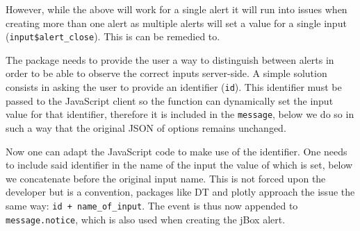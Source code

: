 \documentclass[
]{krantz}
\makeatletter
\newenvironment{Shaded}{\begin{snugshade}}{\end{snugshade}}
\newcommand{\CommentTok}[1]{\textcolor[rgb]{0.37,0.37,0.37}{\textit{#1}}}
\newcommand{\ControlFlowTok}[1]{\textcolor[rgb]{0.27,0.27,0.27}{\textbf{#1}}}
\newcommand{\DataTypeTok}[1]{\textcolor[rgb]{0.27,0.27,0.27}{#1}}
\newcommand{\KeywordTok}[1]{\textcolor[rgb]{0.27,0.27,0.27}{\textbf{#1}}}
\newcommand{\NormalTok}[1]{#1}
\newcommand{\OperatorTok}[1]{\textcolor[rgb]{0.43,0.43,0.43}{\textbf{#1}}}
\newcommand{\StringTok}[1]{\textcolor[rgb]{0.5,0.5,0.5}{#1}}
\newenvironment{kframe}{%
\medskip{}
\setlength{\fboxsep}{.8em}
 \def\at@end@of@kframe{}%
 \ifinner\ifhmode%
  \def\at@end@of@kframe{\end{minipage}}%
  \begin{minipage}{\columnwidth}%
 \fi\fi%
 \def\FrameCommand##1{\hskip\@totalleftmargin \hskip-\fboxsep
 \colorbox{shadecolor}{##1}\hskip-\fboxsep
     \hskip-\linewidth \hskip-\@totalleftmargin \hskip\columnwidth}%
 \MakeFramed {\advance\hsize-\width
   \@totalleftmargin\z@ \linewidth\hsize
   \@setminipage}}%
 {\par\unskip\endMakeFramed%
 \at@end@of@kframe}
\renewenvironment{Shaded}{\begin{kframe}}{\end{kframe}}
\makeatother
\begin{document}
However, while the above will work for a single alert it will run into issues when creating more than one alert as multiple alerts will set a value for a single input (\texttt{input\$alert\_close}). This is can be remedied to.

The package needs to provide the user a way to distinguish between alerts in order to be able to observe the correct inputs server-side.
A simple solution consists in asking the user to provide an identifier (\texttt{id}). This identifier must be passed to the JavaScript client so the function can dynamically set the input value for that identifier, therefore it is included in the \texttt{message}, below we do so in such a way that the original JSON of options remains unchanged.

\begin{Shaded}
\end{Shaded}

Now one can adapt the JavaScript code to make use of the identifier. One needs to include said identifier in the name of the input the value of which is set, below we concatenate before the original input name. This is not forced upon the developer but is a convention, packages like DT and plotly approach the issue the same way: \texttt{id\ +\ name\_of\_input}. The event is thus now appended to \texttt{message.notice}, which is also used when creating the jBox alert.
\end{document}
